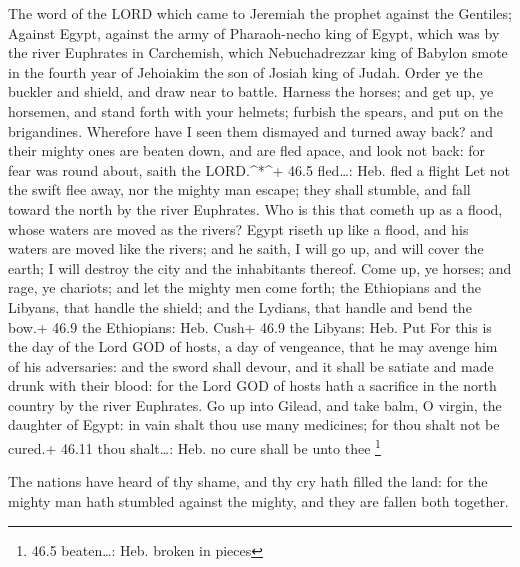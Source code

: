  The word of the LORD which came to Jeremiah the prophet
against the Gentiles;  Against Egypt, against the army of
Pharaoh-necho king of Egypt, which was by the river Euphrates in
Carchemish, which Nebuchadrezzar king of Babylon smote in the fourth
year of Jehoiakim the son of Josiah king of Judah.  Order ye
the buckler and shield, and draw near to battle.  Harness
the horses; and get up, ye horsemen, and stand forth with your helmets;
furbish the spears, and put on the brigandines.  Wherefore
have I seen them dismayed and turned away back? and their mighty ones
are beaten down, and are fled apace, and look not back: for fear was
round about, saith the LORD.\^{}*\^{}+ 46.5 fled\ldots: Heb. fled a
flight  Let not the swift flee away, nor the mighty man
escape; they shall stumble, and fall toward the north by the river
Euphrates.  Who is this that cometh up as a flood, whose
waters are moved as the rivers?  Egypt riseth up like a
flood, and his waters are moved like the rivers; and he saith, I will go
up, and will cover the earth; I will destroy the city and the
inhabitants thereof.  Come up, ye horses; and rage, ye
chariots; and let the mighty men come forth; the Ethiopians and the
Libyans, that handle the shield; and the Lydians, that handle and bend
the bow.+ 46.9 the Ethiopians: Heb. Cush+ 46.9 the Libyans: Heb. Put
 For this is the day of the Lord GOD of hosts, a day of
vengeance, that he may avenge him of his adversaries: and the sword
shall devour, and it shall be satiate and made drunk with their blood:
for the Lord GOD of hosts hath a sacrifice in the north country by the
river Euphrates.  Go up into Gilead, and take balm, O
virgin, the daughter of Egypt: in vain shalt thou use many medicines;
for thou shalt not be cured.+ 46.11 thou shalt\ldots: Heb. no cure shall
be unto thee \footnote{46.5 beaten\ldots: Heb. broken in pieces}

 The nations have heard of thy shame, and thy cry hath
filled the land: for the mighty man hath stumbled against the mighty,
and they are fallen both together.


